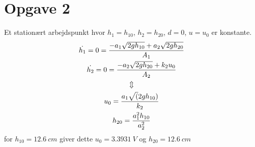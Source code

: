 \section{Opgave 2}
Et stationært arbejdspunkt hvor $h_1 = h_{10}$, $h_2 = h_{20}$, $d=0$, $u = u_0$
er konstante.
\begin{gather*}
\dot{h_1} = 0 = \frac{-a_1\sqrt{2gh_{10}} + a_2\sqrt{2gh_{20}}}{A_1}\\
\dot{h_2} = 0 = \frac{-a_2\sqrt{2gh_{20}} + k_2u_0}{A_2}\\
\Updownarrow\\
u_0 = \frac{a_1\sqrt(2gh_{10})}{k_2}\\
h_{20} = \frac{a_1^2h_{10}}{a_2^2}
\end{gather*}
for $h_{10} = 12.6~cm$ giver dette $u_0 = 3.3931~V$ og $h_{20} = 12.6~cm$